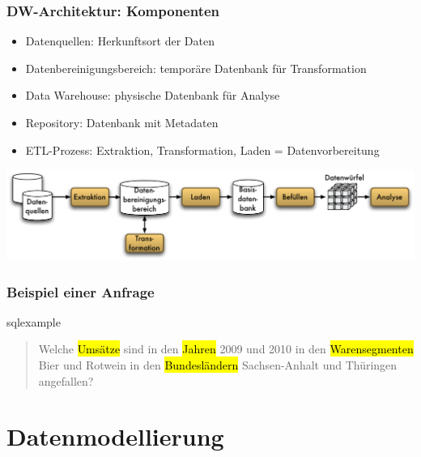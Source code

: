     \begin{frame}
        \frametitle{DW-Architektur: Komponenten}
    
        \begin{itemize}
        \item Datenquellen: Herkunftsort der Daten
        \item Datenbereinigungsbereich: temporäre Datenbank für Transformation
        \item Data Warehouse: physische Datenbank für Analyse
        \item Repository: Datenbank mit Metadaten
        \item ETL-Prozess: Extraktion, Transformation, Laden = Datenvorbereitung
        \end{itemize}
    
        \begin{center}
        \includegraphics[width=.99\textwidth]{fig6/Referenzarchitektur-1.pdf}
        \end{center}
    
        \end{frame}
    
    \begin{frame}[c]
        \frametitle{Beispiel einer Anfrage}
    
        \begin{beamercolorbox}[sep=4pt,colsep*=5pt,shadow=true,rounded=false]{sqlexample}%
        \begin{quote}
            Welche \hl{Umsätze} sind in den \hl{Jahren} 2009 und 2010 in den
                \hl{Warensegmenten} Bier und Rotwein in den
                \hl{Bundesländern} Sachsen-Anhalt und Thüringen angefallen?
        \end{quote}
        \end{beamercolorbox}
    
        \end{frame}
    

    \section{Datenmodellierung}


